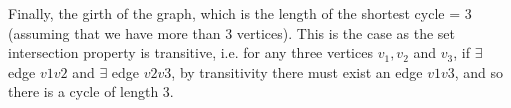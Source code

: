\begin{enumerate}[a)]
\linebreak 
Finally, the girth of the graph, which is the length of the shortest cycle = 3 (assuming that we have more than 3 vertices). This is the case as the set intersection property is transitive, i.e. for any three vertices $v_1, v_2$ and $v_3$, if $\exists$ edge $v1v2$ and $\exists$ edge $v2v3$, by transitivity there must exist an edge $v1v3$, and so there is a cycle of length 3.

\end{enumerate}
